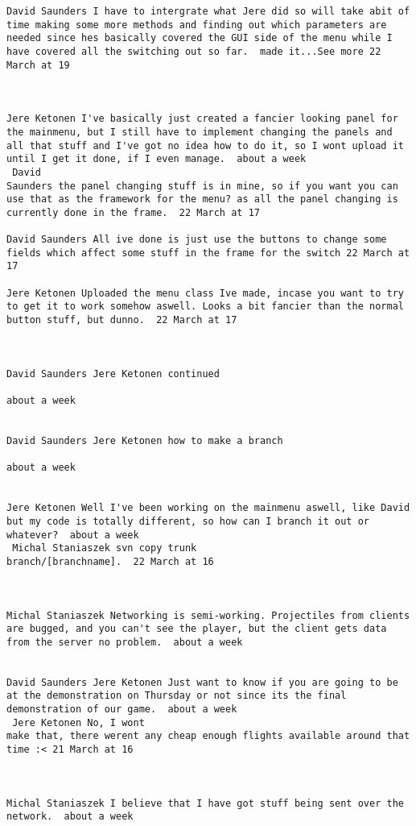 \documentclass[10pt]{report}
\begin{document}
\begin{verbatim}
David Saunders I have to intergrate what Jere did so will take abit of
time making some more methods and finding out which parameters are
needed since hes basically covered the GUI side of the menu while I
have covered all the switching out so far.  made it...See more 22
March at 19



Jere Ketonen I've basically just created a fancier looking panel for
the mainmenu, but I still have to implement changing the panels and
all that stuff and I've got no idea how to do it, so I wont upload it
until I get it done, if I even manage.  about a week 
 David
Saunders the panel changing stuff is in mine, so if you want you can
use that as the framework for the menu? as all the panel changing is
currently done in the frame.  22 March at 17

David Saunders All ive done is just use the buttons to change some
fields which affect some stuff in the frame for the switch 22 March at
17

Jere Ketonen Uploaded the menu class Ive made, incase you want to try
to get it to work somehow aswell. Looks a bit fancier than the normal
button stuff, but dunno.  22 March at 17



David Saunders Jere Ketonen continued

about a week 


David Saunders Jere Ketonen how to make a branch

about a week 


Jere Ketonen Well I've been working on the mainmenu aswell, like David
but my code is totally different, so how can I branch it out or
whatever?  about a week 
 Michal Staniaszek svn copy trunk
branch/[branchname].  22 March at 16



Michal Staniaszek Networking is semi-working. Projectiles from clients
are bugged, and you can't see the player, but the client gets data
from the server no problem.  about a week 


David Saunders Jere Ketonen Just want to know if you are going to be
at the demonstration on Thursday or not since its the final
demonstration of our game.  about a week 
 Jere Ketonen No, I wont
make that, there werent any cheap enough flights available around that
time :< 21 March at 16



Michal Staniaszek I believe that I have got stuff being sent over the
network.  about a week 



\end{verbatim}
\end{document}

